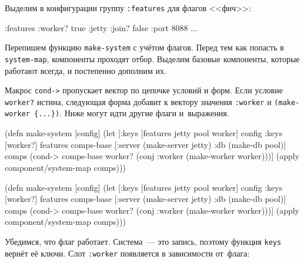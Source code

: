 
Выделим в конфигурации группу \verb|:features| для флагов <<фич>>:

\begin{english}
  \begin{clojure}
{:features {:worker? true}
 :jetty {:join? false :port 8088}
 ...}
  \end{clojure}
\end{english}

Перепишем функцию \verb|make-system| с учётом флагов. Перед тем как попасть в
\verb|system-map|, компоненты проходят отбор. Выделим базовые компоненты,
которые работают всегда, и постепенно дополним их.

Макрос \verb|cond->| пропускает вектор по цепочке условий и форм. Если условие
\verb|worker?| истина, следующая форма добавит к вектору значения \verb|:worker|
и \verb|(make-worker {...})|. Ниже могут идти другие флаги и~выражения.

\ifx\DEVICETYPE\MOBILE

\begin{english}
  \begin{clojure}
(defn make-system [config]
  (let [{:keys [features jetty
                pool worker]} config
        {:keys [worker?]} features
        comps-base [:server
                    (make-server jetty)
                    :db (make-db pool)]
        comps (cond-> comps-base
                worker?
                (conj :worker
                  (make-worker worker)))]
    (apply component/system-map comps)))
  \end{clojure}
\end{english}

\else

\begin{english}
  \begin{clojure}
(defn make-system [config]
  (let [{:keys [features jetty pool worker]} config
        {:keys [worker?]} features
        comps-base [:server (make-server jetty)
                    :db (make-db pool)]
        comps (cond-> comps-base
                worker?
                (conj :worker (make-worker worker)))]
    (apply component/system-map comps)))
  \end{clojure}
\end{english}

\fi

Убедимся, что флаг работает. Система~--- это запись, поэтому функция \verb|keys|
вернёт её ключи. Слот \verb|:worker| появляется в зависимости от~флага:

